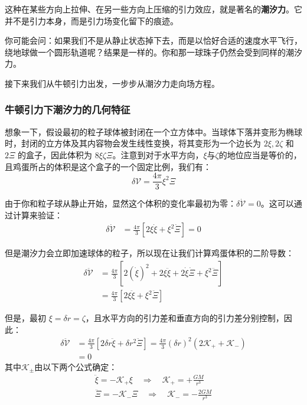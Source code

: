 \documentclass[../Main.tex]{subfiles}
\begin{document}
这种在某些方向上拉伸、在另一些方向上压缩的引力效应，就是著名的\textbf{潮汐力}。它并不是引力本身，而是引力场变化留下的痕迹。

你可能会问：如果我们不是从静止状态掉下去，而是以恰好合适的速度水平飞行，绕地球做一个圆形轨道呢？结果是一样的。你和那一球珠子仍然会受到同样的潮汐力。

接下来我们从牛顿引力出发，一步步从潮汐力走向场方程。

\subsubsection{牛顿引力下潮汐力的几何特征}

想象一下，假设最初的粒子球体被封闭在一个立方体中。当球体下落并变形为椭球时，封闭的立方体及其内容物会发生线性变换，将其变形为一个边长为 $2\xi, 2\zeta$ 和 $2\Xi$ 的盒子，因此体积为 $8\xi\zeta\Xi$。注意到对于水平方向，$\xi$与$\zeta$的地位应当是等价的，且鸡蛋所占的体积是这个盒子的一个固定比例，我们有：
\begin{equation}
\delta \mathcal{V} = \frac{4\pi}{3} \xi^2 \Xi\label{1.1.1.1}
\end{equation}

由于你和粒子球从静止开始，显然这个体积的变化率最初为零：$\delta \dot{\mathcal{V}} = 0$。这可以通过计算来验证：
\begin{align*}
\delta \dot{\mathcal{V}} &= \frac{4\pi}{3} \left[ 2\xi \dot{\xi} + \xi^2 \dot{\Xi} \right] = 0
\end{align*}

但是潮汐力会立即加速球体的粒子，所以现在让我们计算鸡蛋体积的二阶导数：
\begin{align*}
\delta \ddot{\mathcal{V}} &= \frac{4\pi}{3} \left[ 2(\dot{\xi})^2 + 2\xi \ddot{\xi} + 2\dot{\xi} \dot{\Xi} + \xi^2 \ddot{\Xi} \right] \\
&= \frac{4\pi}{3} \left[ 2\xi \ddot{\xi} + \xi^2 \ddot{\Xi} \right]
\end{align*}

但是，最初 $\xi = \delta r = \zeta$，且水平方向的引力差和垂直方向的引力差分别控制，因此：
\begin{align*}
\delta \ddot{\mathcal{V}} &= \frac{4\pi}{3} \left[ 2\delta r \ddot{\xi} + \delta r^2 \ddot{\Xi} \right] = \frac{4\pi}{3} (\delta r)^2 \left( 2\mathcal{K}_+ + \mathcal{K}_- \right) \\
&= {0}
\end{align*}
其中$\mathcal K_{\pm}$由以下两个公式确定：
\begin{gather*}
    \ddot{\xi} = -\mathcal{K}_+ \xi \quad \Rightarrow \quad \mathcal{K}_+ = +\frac{GM}{r^3}\\
    \ddot{\Xi} = -\mathcal{K}_- \Xi \quad \Rightarrow \quad \mathcal{K}_- = -\frac{2GM}{r^3}
\end{gather*}
\end{document}
